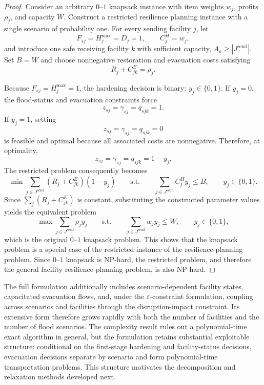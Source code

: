 \documentclass[preprint,11pt,authoryear]{elsarticle}
\begin{document}
\begin{proof}
Consider an arbitrary \(0\)--\(1\) knapsack instance with item weights \(w_j\),
profits \(\rho_j\), and capacity \(W\). Construct a restricted resilience
planning instance with a single scenario of probability one. For every sending
facility \(j\), let
\[
F_{sj}=H_j^{\max}=D_j=1,\qquad
C_j^H=w_j,
\]
and introduce one safe receiving facility \(k\) with sufficient capacity,
\(A_k\ge |J^{\mathrm{send}}|\). Set \(B=W\) and choose nonnegative restoration
and evacuation costs satisfying
\[
R_j+C_{jk}^E=\rho_j.
\]

Because \(F_{sj}=H_j^{\max}=1\), the hardening decision is binary:
\(y_j\in\{0,1\}\). If \(y_j=0\), the flood-status and evacuation constraints
force
\[
z_{sj}=\gamma_{sj}=q_{sjk}=1.
\]
If \(y_j=1\), setting
\[
z_{sj}=\gamma_{sj}=q_{sjk}=0
\]
is feasible and optimal because all associated costs are nonnegative.
Therefore, at optimality,
\[
z_{sj}=\gamma_{sj}=q_{sjk}=1-y_j.
\]
The restricted problem consequently becomes
\[
\min \sum_{j\in J^{\mathrm{send}}}
(R_j+C_{jk}^E)(1-y_j)
\qquad
\text{s.t.}
\qquad
\sum_{j\in J^{\mathrm{send}}} C_j^H y_j\le B,
\qquad
y_j\in\{0,1\}.
\]
Since \(\sum_j(R_j+C_{jk}^E)\) is constant, substituting the constructed
parameter values yields the equivalent problem
\[
\max \sum_{j\in J^{\mathrm{send}}}\rho_j y_j
\qquad
\text{s.t.}
\qquad
\sum_{j\in J^{\mathrm{send}}}w_j y_j\le W,
\qquad
y_j\in\{0,1\},
\]
which is the original \(0\)--\(1\) knapsack problem. This shows that the knapsack problem is a special case of the restricted instance of the resilience-planning problem. Since \(0\)--\(1\) knapsack is NP-hard, the restricted problem, and therefore the general facility resilience-planning problem, is also NP-hard.
\end{proof}

The full formulation additionally includes scenario-dependent facility states,
capacitated evacuation flows, and, under the \(\varepsilon\)-constraint
formulation, coupling across scenarios and facilities through the disruption-impact constraint. Its extensive form therefore grows rapidly with both the number of facilities and the number of flood scenarios. The complexity result rules out
a polynomial-time exact algorithm in general, but the formulation retains substantial exploitable structure: conditional on the first-stage hardening and
facility-status decisions, evacuation decisions separate by scenario and form
polynomial-time transportation problems. This structure motivates the decomposition and relaxation methods developed next.
\end{document}
